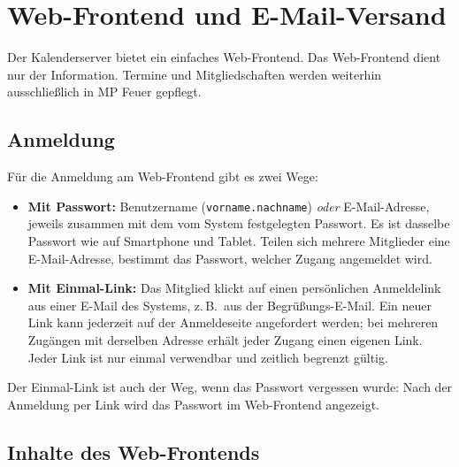 \documentclass[a4paper,fontsize=10pt]{scrartcl}
\begin{document}
\section{Web-Frontend und E-Mail-Versand}\label{sec:web}

Der Kalenderserver bietet ein einfaches Web-Frontend. Das Web-Frontend dient
nur der Information. Termine und Mitgliedschaften werden
weiterhin ausschließlich in MP Feuer gepflegt.

\subsection*{Anmeldung}

Für die Anmeldung am Web-Frontend gibt es zwei Wege:

\begin{itemize}
  \item \textbf{Mit Passwort:} Benutzername (\texttt{vorname.nachname})
        \emph{oder} E-Mail-Adresse, jeweils zusammen mit dem vom System
        festgelegten Passwort. Es ist dasselbe Passwort wie auf Smartphone
        und Tablet. Teilen sich mehrere Mitglieder eine E-Mail-Adresse,
        bestimmt das Passwort, welcher Zugang angemeldet wird.
  \item \textbf{Mit Einmal-Link:} Das Mitglied klickt auf einen persönlichen
        Anmeldelink aus einer E-Mail des Systems, z.\,B.\ aus der
        Begrüßungs-E-Mail. Ein neuer Link kann jederzeit auf der Anmeldeseite
        angefordert werden; bei mehreren Zugängen mit derselben Adresse
        erhält jeder Zugang einen eigenen Link. Jeder Link ist nur einmal
        verwendbar und zeitlich begrenzt gültig.
\end{itemize}

Der Einmal-Link ist auch der Weg, wenn das Passwort vergessen wurde: Nach der
Anmeldung per Link wird das Passwort im Web-Frontend angezeigt.

\subsection*{Inhalte des Web-Frontends}
\end{document}
